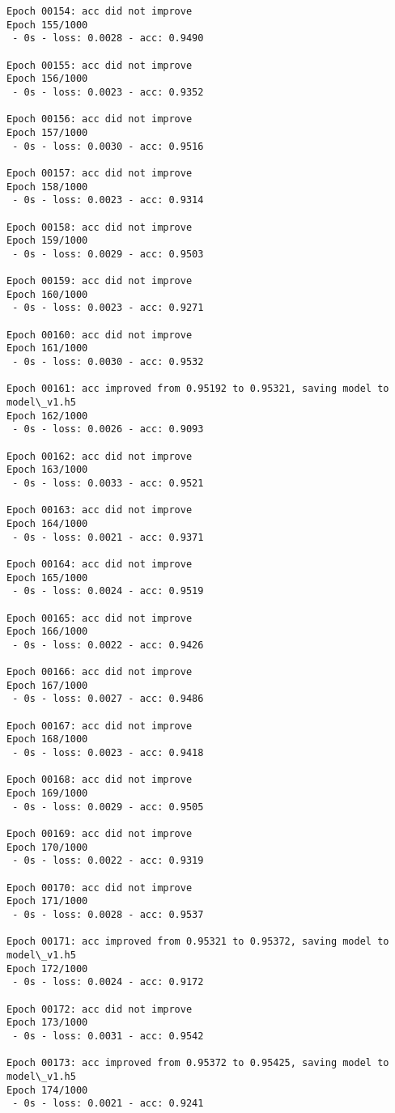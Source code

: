 \documentclass[11pt]{article}
\begin{document}
\begin{Verbatim}[commandchars=\\\{\}]
Epoch 00154: acc did not improve
Epoch 155/1000
 - 0s - loss: 0.0028 - acc: 0.9490

Epoch 00155: acc did not improve
Epoch 156/1000
 - 0s - loss: 0.0023 - acc: 0.9352

Epoch 00156: acc did not improve
Epoch 157/1000
 - 0s - loss: 0.0030 - acc: 0.9516

Epoch 00157: acc did not improve
Epoch 158/1000
 - 0s - loss: 0.0023 - acc: 0.9314

Epoch 00158: acc did not improve
Epoch 159/1000
 - 0s - loss: 0.0029 - acc: 0.9503

Epoch 00159: acc did not improve
Epoch 160/1000
 - 0s - loss: 0.0023 - acc: 0.9271

Epoch 00160: acc did not improve
Epoch 161/1000
 - 0s - loss: 0.0030 - acc: 0.9532

Epoch 00161: acc improved from 0.95192 to 0.95321, saving model to model\_v1.h5
Epoch 162/1000
 - 0s - loss: 0.0026 - acc: 0.9093

Epoch 00162: acc did not improve
Epoch 163/1000
 - 0s - loss: 0.0033 - acc: 0.9521

Epoch 00163: acc did not improve
Epoch 164/1000
 - 0s - loss: 0.0021 - acc: 0.9371

Epoch 00164: acc did not improve
Epoch 165/1000
 - 0s - loss: 0.0024 - acc: 0.9519

Epoch 00165: acc did not improve
Epoch 166/1000
 - 0s - loss: 0.0022 - acc: 0.9426

Epoch 00166: acc did not improve
Epoch 167/1000
 - 0s - loss: 0.0027 - acc: 0.9486

Epoch 00167: acc did not improve
Epoch 168/1000
 - 0s - loss: 0.0023 - acc: 0.9418

Epoch 00168: acc did not improve
Epoch 169/1000
 - 0s - loss: 0.0029 - acc: 0.9505

Epoch 00169: acc did not improve
Epoch 170/1000
 - 0s - loss: 0.0022 - acc: 0.9319

Epoch 00170: acc did not improve
Epoch 171/1000
 - 0s - loss: 0.0028 - acc: 0.9537

Epoch 00171: acc improved from 0.95321 to 0.95372, saving model to model\_v1.h5
Epoch 172/1000
 - 0s - loss: 0.0024 - acc: 0.9172

Epoch 00172: acc did not improve
Epoch 173/1000
 - 0s - loss: 0.0031 - acc: 0.9542

Epoch 00173: acc improved from 0.95372 to 0.95425, saving model to model\_v1.h5
Epoch 174/1000
 - 0s - loss: 0.0021 - acc: 0.9241


\end{Verbatim}
\end{document}

